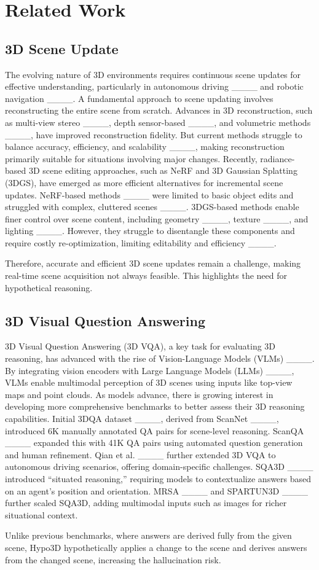 \section{Related Work}
\subsection{3D Scene Update} 

The evolving nature of 3D environments requires continuous scene updates for effective understanding, particularly in autonomous driving ____ and robotic navigation ____. A fundamental approach to scene updating involves reconstructing the entire scene from scratch. Advances in 3D reconstruction, such as multi-view stereo ____, depth sensor-based ____, and volumetric methods ____, have improved reconstruction fidelity. But current methods struggle to balance accuracy, efficiency, and scalability ____, making reconstruction primarily suitable for situations involving major changes. Recently, radiance-based 3D scene editing approaches, such as NeRF and 3D Gaussian Splatting (3DGS), have emerged as more efficient alternatives for incremental scene updates. NeRF-based methods ____ were limited to basic object edits and struggled with complex, cluttered scenes ____. 3DGS-based methods enable finer control over scene content, including geometry ____, texture ____, and lighting ____. However, they struggle to disentangle these components and require costly re-optimization, limiting editability and efficiency ____. 

Therefore, accurate and efficient 3D scene updates remain a challenge, making real-time scene acquisition not always feasible. This highlights the need for hypothetical reasoning.

\subsection{3D Visual Question Answering}
3D Visual Question Answering (3D VQA), a key task for evaluating 3D reasoning, has advanced with the rise of Vision-Language Models (VLMs) ____. By integrating vision encoders with Large Language Models (LLMs) ____, VLMs enable multimodal perception of 3D scenes using inputs like top-view maps and point clouds. As models advance, there is growing interest in developing more comprehensive benchmarks to better assess their 3D reasoning capabilities. Initial 3DQA dataset ____, derived from ScanNet ____, introduced 6K manually annotated QA pairs for scene-level reasoning. ScanQA ____ expanded this with 41K QA pairs using automated question generation and human refinement. Qian et al. ____ further extended 3D VQA to autonomous driving scenarios, offering domain-specific challenges. SQA3D ____ introduced “situated reasoning,” requiring models to contextualize answers based on an agent’s position and orientation. MRSA ____ and SPARTUN3D ____ further scaled SQA3D, adding multimodal inputs such as images for richer situational context. 

Unlike previous benchmarks, where answers are derived fully from the given scene, Hypo3D hypothetically applies a change to the scene and derives answers from the changed scene, increasing the hallucination risk.